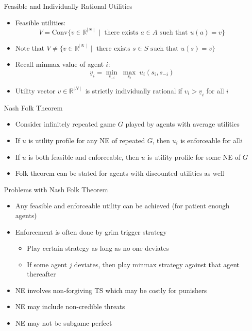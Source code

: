 \documentclass[11pt,aspectratio=169]{beamer}
\begin{document}
  \begin{frame}{Feasible and Individually Rational Utilities}
   \begin{itemize}[<+->]
   \setlength{\itemsep}{1.2em}
    \item \alert{Feasible utilities}: 
    $$V = \text{Conv}\{ v \in  \mathbb{R}^{\mid N \mid} \mid \text{ there exists } a \in A \text{ such that } u(a) = v \}$$
    \item Note that $V \neq  \{ v \in  \mathbb{R} ^{\mid N \mid}  \mid \text{ there exists } s \in S \text{ such that } u (s) = v \}$
    \item Recall \alert{minmax value} of agent $i$: 
    $$\underline{v}_i = \underset{s_{-i}}{\min} \; \underset{s_{i}}{\max} \; u_{i}(s_i,s_{-i})$$
    \item Utility vector  $ v \in  \mathbb{R} ^{\mid N \mid}$  is \alert{strictly individually rational} if $v_{i}  > \underline{v}_i$ for all $i$   
   \end{itemize}
  \end{frame}
  
  
  \begin{frame}{Nash Folk Theorem}
   \begin{itemize}[<+->]
   \setlength{\itemsep}{1.2em}
    \item Consider infinitely repeated game $G$ played by agents with \alert{average utilities}
    \item If $u$ is utility profile for any NE of repeated $G$, then $u_i$ is enforceable for all$i$
    \item If $u$ is both feasible and enforceable, then $u$ is utility profile for some NE of $G$
    \item Folk theorem can be stated for agents with discounted utilities as well
   \end{itemize}
  \end{frame}
  
  
  \begin{frame}{Problems with Nash Folk Theorem}
   \begin{itemize}[<+->]
    \setlength{\itemsep}{1em}
    \item Any feasible and enforceable utility can be achieved (for \alert{patient enough} agents)
    \item Enforcement is often done by grim trigger strategy
    \begin{itemize}
     \item Play certain strategy as long as no one deviates
     \item If some agent $j$  deviates, then play minmax strategy against that agent thereafter
    \end{itemize}
    \item NE involves non-forgiving TS which may be costly for punishers
    \item NE may include \alert{non-credible threats}
    \item NE may not be subgame perfect
   \end{itemize}
  \end{frame}
  
\end{document}
